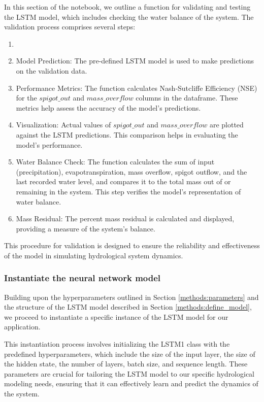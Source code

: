 \documentclass{article}
\begin{document}
In this section of the notebook, we outline a function for validating and testing the LSTM model, which includes checking the water balance of the system. The validation process comprises several steps:

\begin{enumerate}
    \item 
    \item  Model Prediction: The pre-defined LSTM model is used to make predictions on the validation data.
    
    \item Performance Metrics: The function calculates Nash-Sutcliffe Efficiency (NSE) for the $spigot\_out$ and $mass\_overflow$ columns in the dataframe. These metrics help assess the accuracy of the model's predictions.
    
    \item Visualization: Actual values of $spigot\_out$ and $mass\_overflow$ are plotted against the LSTM predictions. This comparison helps in evaluating the model's performance.
    
    \item Water Balance Check: The function calculates the sum of input (precipitation), evapotranspiration, mass overflow, spigot outflow, and the last recorded water level, and compares it to the total mass out of or remaining in the system. This step verifies the model's representation of water balance.
    
    \item Mass Residual: The percent mass residual is calculated and displayed, providing a measure of the system's balance.
\end{enumerate}

This procedure for validation is designed to ensure the reliability and effectiveness of the model in simulating hydrological system dynamics.

\subsubsection{Instantiate the neural network model}
\label{methods:instantiate}
Building upon the hyperparameters outlined in Section \ref{methods:parameters} and the structure of the LSTM model described in Section \ref{methods:define_model}, we proceed to instantiate a specific instance of the LSTM model for our application.

This instantiation process involves initializing the LSTM1 class with the predefined hyperparameters, which include the size of the input layer, the size of the hidden state, the number of layers, batch size, and sequence length. These parameters are crucial for tailoring the LSTM model to our specific hydrological modeling needs, ensuring that it can effectively learn and predict the dynamics of the system.
\end{document}
